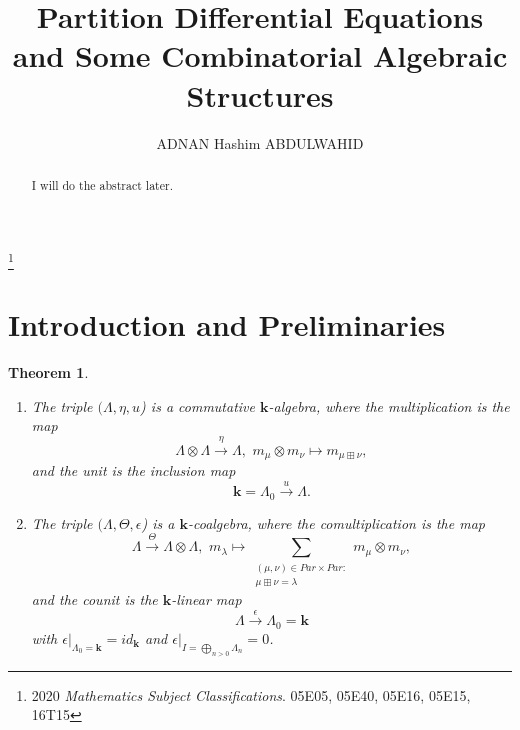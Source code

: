 \documentclass[11pt]{amsart}
\title{Partition Differential Equations and Some Combinatorial Algebraic Structures}
\author{ADNAN Hashim ABDULWAHID}
\date{}
\newtheorem{theorem}{Theorem}[section]
\theoremstyle{remark}
\newcommand\kk{\mathbf{k}}
\theoremstyle{definition}
\theoremstyle{remark}
\numberwithin{equation}{section}
\begin{document}
	
	
	
	\begin{abstract}
		\noindent 
		I will do the abstract later.
		
	\end{abstract}
	
	\thanks{2020 \textit{Mathematics Subject Classifications}.  05E05, 05E40, 	05E16,  05E15, 16T15 }%
\date{}

\maketitle






\noindent

\section{\textbf{Introduction and Preliminaries}}\label{intro.sec} 








\vspace{1cm}



\begin{theorem} \label{thm.dial.14}\textbf{}
	\begin{enumerate}[label=(\roman*)]
		\item The triple $(\Lambda, \eta, u$) is a commutative $\kk$-algebra, where the multiplication is the map	
		$$\Lambda \otimes \Lambda  \overset{\eta}{\longrightarrow} \Lambda, \,\, m_{\mu} \otimes m_{\nu} \mapsto m_{\mu \boxplus \nu},$$ 
		and the unit is the inclusion map $$\kk = \Lambda_0 \overset{u}{\longrightarrow} \Lambda.$$
		\item The triple $(\Lambda, \Theta, \epsilon$) is a $\kk$-coalgebra, where the comultiplication is the map	
		$$\Lambda  \overset{\Theta}{\longrightarrow} \Lambda \otimes \Lambda, \,\, m_{\lambda} \mapsto \sum\limits_{\substack{ (\mu, \nu) \in Par \times Par:\\ \mu \boxplus \nu = \lambda} } m_\mu \otimes m_\nu, $$ 
		and the  counit is the $\kk$-linear map $$\Lambda \overset{\epsilon}{\longrightarrow} \Lambda_0=\kk$$ with $\epsilon|_{\Lambda_0 = \kk} = id_{\kk}$  and  $\epsilon|_{I=\bigoplus_{n > 0} \Lambda_n} = 0$.  
	\end{enumerate}
\end{theorem}
\end{document}
